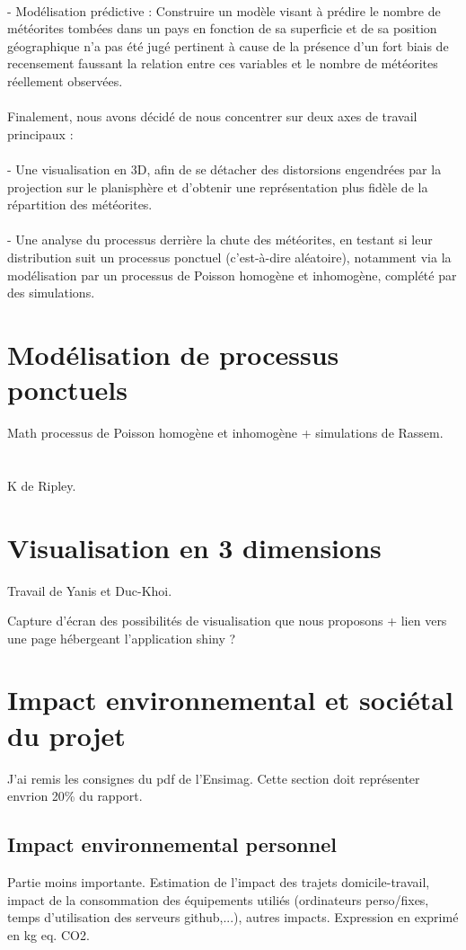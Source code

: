 \documentclass[12pt]{article}
\begin{document}
\\
- Modélisation prédictive : Construire un modèle visant à prédire le nombre de météorites tombées dans un pays en fonction de sa superficie et de sa position géographique n’a pas été jugé pertinent à cause de la présence d’un fort biais de recensement faussant la relation entre ces variables et le nombre de météorites réellement observées.\\
\\
Finalement, nous avons décidé de nous concentrer sur deux axes de travail principaux :\\
\\
- Une visualisation en 3D, afin de se détacher des distorsions engendrées par la projection sur le planisphère et d’obtenir une représentation plus fidèle de la répartition des météorites.\\
\\
- Une analyse du processus derrière la chute des météorites, en testant si leur distribution suit un processus ponctuel (c’est-à-dire aléatoire), notamment via la modélisation par un processus de Poisson homogène et inhomogène, complété par des simulations.

\section{Modélisation de processus ponctuels}
Math processus de Poisson homogène et inhomogène + simulations de Rassem.\\
\\
\cite{analysing_spacial_points}
\\
K de Ripley.\\
\section{Visualisation en 3 dimensions}
Travail de Yanis et Duc-Khoi.

Capture d'écran des possibilités de visualisation que nous proposons + lien vers une page hébergeant l'application shiny ?
\section{Impact environnemental et sociétal du projet}
J'ai remis les consignes du pdf de l'Ensimag. Cette section doit représenter envrion 20\% du rapport.
\subsection{Impact environnemental personnel}
Partie moins importante.
Estimation de l'impact des trajets domicile-travail, impact de la consommation des équipements utiliés (ordinateurs perso/fixes, temps d'utilisation des serveurs github,...), autres impacts.
Expression en exprimé en kg eq. CO2.
\end{document}
